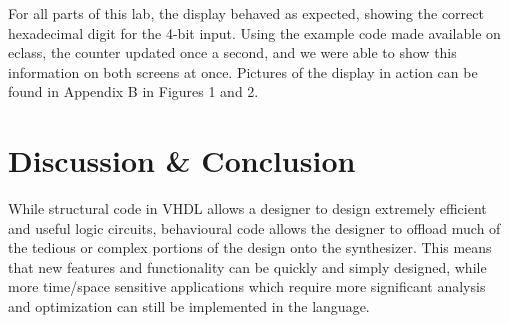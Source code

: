 \documentclass{article}
\begin{document}
For all parts of this lab, the display behaved as expected,
showing the correct hexadecimal digit for the 4-bit input.
Using the example code made available on eclass, the counter updated once a second, and we were able
to show this information on both screens at once.
Pictures of the display in action can be found in Appendix B in Figures 1 and 2.

\section{Discussion \& Conclusion}

While structural code in VHDL allows a designer to design extremely efficient and useful
logic circuits, behavioural code allows the designer to offload much of the tedious or complex
portions of the design onto the synthesizer.
This means that new features and functionality can be quickly and simply designed, while more time/space sensitive applications which require more significant analysis and optimization can still be implemented in the language.

\vskip 2cm
\end{document}
